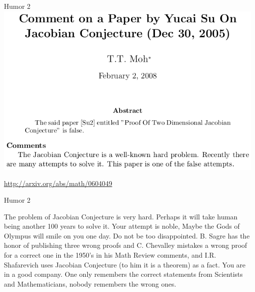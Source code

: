 \documentclass{beamer}
\begin{document}
\begin{frame}{Humor 2}
  \includegraphics[width=\textwidth]{Etapas/olympus-abs}

  \url{http://arxiv.org/abs/math/0604049}
\end{frame}

\begin{frame}{Humor 2}
  \begin{block}{}
    The problem of Jacobian Conjecture is very hard. Perhaps it will
    take human being another 100 years to solve it. \alert{Your
      attempt is noble, Maybe the Gods of Olympus will smile on you
      one day.} Do not be too disappointed. B. Sagre has the honor of
    publishing three wrong proofs and C. Chevalley mistakes a wrong
    proof for a correct one in the 1950’s in his Math Review comments,
    and I.R. Shafarevich uses Jacobian Conjecture (to him it is a
    theorem) as a fact. You are in a good company. One only remembers
    the correct statements from Scientists and Mathematicians, nobody
    remembers the wrong ones.
  \end{block}
\end{frame}
\end{document}
